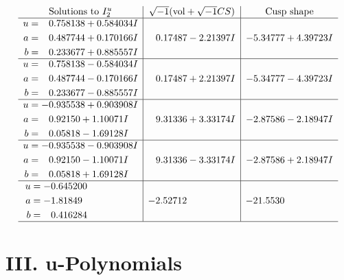 \documentclass[1p]{elsarticle_modified}
\theoremstyle{definition}
\newcommand{\I}{\sqrt{-1}}
\begin{document}
$$\begin{array}{c|c|c}  
\text{Solutions to }I^u_{2}& \I (\text{vol} + \sqrt{-1}CS) & \text{Cusp shape}\\
 \hline 
\begin{aligned}
u &= \phantom{-}0.758138 + 0.584034 I \\
a &= \phantom{-}0.487744 + 0.170166 I \\
b &= \phantom{-}0.233677 + 0.885557 I\end{aligned}
 & \phantom{-}0.17487 - 2.21397 I & -5.34777 + 4.39723 I \\ \hline\begin{aligned}
u &= \phantom{-}0.758138 - 0.584034 I \\
a &= \phantom{-}0.487744 - 0.170166 I \\
b &= \phantom{-}0.233677 - 0.885557 I\end{aligned}
 & \phantom{-}0.17487 + 2.21397 I & -5.34777 - 4.39723 I \\ \hline\begin{aligned}
u &= -0.935538 + 0.903908 I \\
a &= \phantom{-}0.92150 + 1.10071 I \\
b &= \phantom{-}0.05818 - 1.69128 I\end{aligned}
 & \phantom{-}9.31336 + 3.33174 I & -2.87586 - 2.18947 I \\ \hline\begin{aligned}
u &= -0.935538 - 0.903908 I \\
a &= \phantom{-}0.92150 - 1.10071 I \\
b &= \phantom{-}0.05818 + 1.69128 I\end{aligned}
 & \phantom{-}9.31336 - 3.33174 I & -2.87586 + 2.18947 I \\ \hline\begin{aligned}
u &= -0.645200\phantom{ +0.000000I} \\
a &= -1.81849\phantom{ +0.000000I} \\
b &= \phantom{-}0.416284\phantom{ +0.000000I}\end{aligned}
 & -2.52712\phantom{ +0.000000I} & -21.5530\phantom{ +0.000000I}\\
 \hline 
 \end{array}$$\newpage
\newpage\renewcommand{\arraystretch}{1}
\centering \section*{ III. u-Polynomials}
\end{document}

